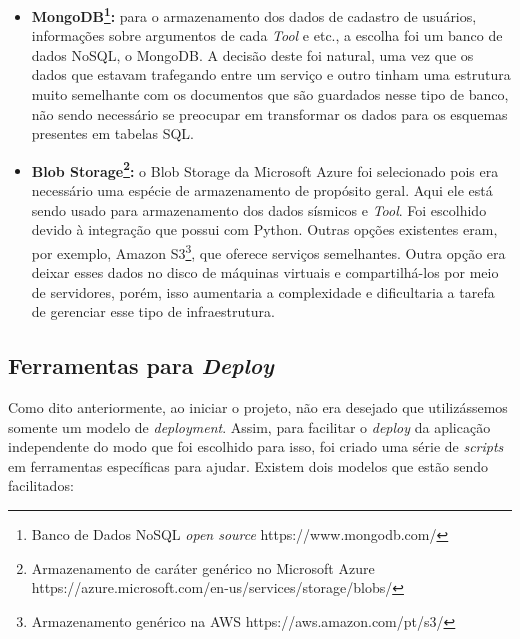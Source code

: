 \documentclass[11pt,twoside]{article}
\begin{document}
\begin{itemize}
  \item \textbf{MongoDB\footnote{Banco de Dados NoSQL \emph{open source} https://www.mongodb.com/}:} para o armazenamento dos dados de cadastro de usuários, informações sobre argumentos de cada \emph{Tool} e etc., a escolha foi um banco de dados NoSQL, o MongoDB. A decisão deste
  foi natural, uma vez que os dados que estavam trafegando entre um serviço e outro tinham uma estrutura muito semelhante com os documentos que são guardados nesse tipo de banco, não sendo necessário se preocupar
  em transformar os dados para os esquemas presentes em tabelas SQL.

  \item \textbf{Blob Storage\footnote{Armazenamento de caráter genérico no Microsoft Azure https://azure.microsoft.com/en-us/services/storage/blobs/}:} o Blob Storage da Microsoft Azure foi selecionado pois era necessário uma espécie de armazenamento de propósito geral. Aqui ele está sendo usado para armazenamento dos dados sísmicos e
  \emph{Tool}. Foi escolhido devido à integração que possui com Python. Outras opções existentes eram, por exemplo, Amazon S3\footnote{Armazenamento genérico na AWS https://aws.amazon.com/pt/s3/}, que oferece serviços semelhantes. Outra opção era deixar esses dados 
  no disco de máquinas virtuais e compartilhá-los por meio de servidores, porém, isso aumentaria a complexidade e dificultaria a tarefa de gerenciar esse tipo de infraestrutura.
\end{itemize}

\subsection{Ferramentas para \emph{Deploy}}

Como dito anteriormente, ao iniciar o projeto, não era desejado que utilizássemos somente um modelo de \emph{deployment}. Assim, para facilitar o \emph{deploy} da aplicação independente
do modo que foi escolhido para isso, foi criado uma série de \emph{scripts} em ferramentas específicas para ajudar. Existem dois modelos que estão sendo facilitados:
\end{document}
